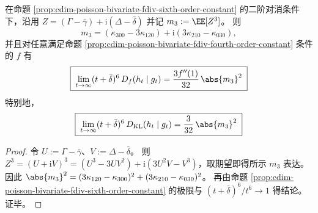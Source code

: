 \begin{corollary}\label{cor:cdim-poisson-bivariate-fdiv-sixth-order-complex-m3}
在命题 \ref{prop:cdim-poisson-bivariate-fdiv-sixth-order-constant} 的二阶对消条件下，沿用
\(
Z=(\Gamma-\bar\gamma)+\mathrm{i}(\Delta-\bar\delta)
\)
并记 \(m_3:=\EE[Z^3]\)。
则
\[
\boxed{\;
m_3=(\kappa_{300}-3\kappa_{120})+\mathrm{i}(3\kappa_{210}-\kappa_{030}),\;}
\]
并且对任意满足命题 \ref{prop:cdim-poisson-bivariate-fdiv-fourth-order-constant} 条件的 \(f\) 有
\[
\boxed{\;
\lim_{t\to\infty}(t+\bar\delta)^6\,D_f(h_t\mid g_t)=\frac{3f''(1)}{32}\,\abs{m_3}^2\;}
\]
特别地，
\[
\boxed{\;
\lim_{t\to\infty}(t+\bar\delta)^6\,D_{\mathrm{KL}}(h_t\mid g_t)=\frac{3}{32}\,\abs{m_3}^2\;}
\]
\end{corollary}
\begin{proof}
令 \(U:=\Gamma-\bar\gamma\)、\(V:=\Delta-\bar\delta\)。
则 \(Z^3=(U+\mathrm{i}V)^3=(U^3-3UV^2)+\mathrm{i}(3U^2V-V^3)\)，取期望即得所示 \(m_3\) 表达。
因此
\(
\abs{m_3}^2=(3\kappa_{120}-\kappa_{300})^2+(3\kappa_{210}-\kappa_{030})^2
\)。
再由命题 \ref{prop:cdim-poisson-bivariate-fdiv-sixth-order-constant} 的极限与 \((t+\bar\delta)^6/t^6\to 1\) 得结论。证毕。
\end{proof}

